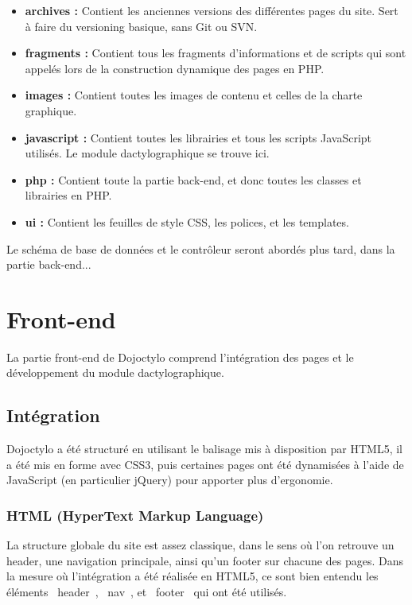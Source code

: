 \documentclass[a4paper,12pt]{article}
\begin{document}
\begin{itemize}
 \item{\textbf{archives :} Contient les anciennes versions des différentes pages du site. Sert à faire du versioning basique, sans Git ou SVN.}
 \item{\textbf{fragments :} Contient tous les fragments d'informations et de scripts qui sont appelés lors de la construction dynamique des pages en PHP.}
 \item{\textbf{images :} Contient toutes les images de contenu et celles de la charte graphique.}
 \item{\textbf{javascript :} Contient toutes les librairies et tous les scripts JavaScript utilisés. Le module dactylographique se trouve ici.}
 \item{\textbf{php :} Contient toute la partie back-end, et donc toutes les classes et librairies en PHP.}
 \item{\textbf{ui :} Contient les feuilles de style CSS, les polices, et les templates.}
\end{itemize}

Le schéma de base de données et le contrôleur seront abordés plus tard, dans la partie back-end...

\newpage

\section{Front-end}

La partie front-end de Dojoctylo comprend l'intégration des pages et le développement du module dactylographique.

\subsection{Intégration}

Dojoctylo a été structuré en utilisant le balisage mis à disposition par HTML5, il a été mis en forme avec CSS3, puis certaines pages ont été dynamisées à l'aide de JavaScript (en particulier jQuery) pour apporter plus d'ergonomie.

\subsubsection{HTML (HyperText Markup Language)}

La structure globale du site est assez classique, dans le sens où l'on retrouve un header, une navigation principale, ainsi qu'un footer sur chacune des pages. Dans la mesure où l'intégration a été réalisée en HTML5, ce sont bien entendu les éléments \og~header~\fg, \og~nav~\fg, et \og~footer~\fg{} qui ont été utilisés.
\end{document}
